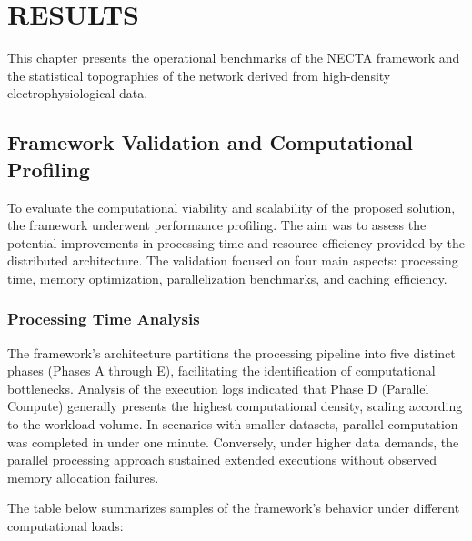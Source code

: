 \chapter{RESULTS}

\label{sec:results_intro}
This chapter presents the operational benchmarks of the NECTA framework and the statistical topographies of the network derived from high-density electrophysiological data.

\section{Framework Validation and Computational Profiling}
\label{sec:framework_validation}

To evaluate the computational viability and scalability of the proposed solution, the framework underwent performance profiling. The aim was to assess the potential improvements in processing time and resource efficiency provided by the distributed architecture. The validation focused on four main aspects: processing time, memory optimization, parallelization benchmarks, and caching efficiency.

\subsection{Processing Time Analysis}

The framework's architecture partitions the processing pipeline into five distinct phases (Phases A through E), facilitating the identification of computational bottlenecks. Analysis of the execution logs indicated that Phase D (Parallel Compute) generally presents the highest computational density, scaling according to the workload volume. In scenarios with smaller datasets, parallel computation was completed in under one minute. Conversely, under higher data demands, the parallel processing approach sustained extended executions without observed memory allocation failures.

The table below summarizes samples of the framework's behavior under different computational loads:

\begin{table}[htbp]
\centering
\caption{Framework performance samples under different computational loads.}
\label{tab:framework_performance}
\end{table}

